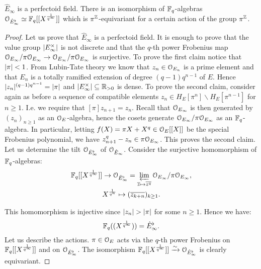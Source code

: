 \begin{prop}\label{ehatprop}
$\hat{E}_{\infty}$ is a perfectoid field. 
There is an isomorphism of $\mathbb{F}_q$-algebras $\mathcal{O}_{\hat{E}_{\infty}^{\flat}}\simeq\mathbb{F}_q[[X^{\frac{1}{q^\infty}}]]$ which is $\pi^{\mathbb{Z}}$-equivariant for a certain action of the group $\pi^{\mathbb{Z}}$.
\end{prop}
\begin{proof}
Let us prove that $\hat{E}_{\infty}$ is a perfectoid field. It is enough to prove that the value group $\lvert E^\times_{\infty}\rvert$ is not discrete and that the $q$-th power Frobenius map
$\mathcal{O}_{E_{\infty}}/\pi\mathcal{O}_{E_{\infty}}\to\mathcal{O}_{E_{\infty}}/\pi\mathcal{O}_{E_{\infty}}$ is surjective.
To prove the first claim notice that $\lvert\pi\rvert<1$. From Lubin-Tate theory we know that $z_n\in\mathcal{O}_{E_n}$ is a prime element and that $E_n$ is a totally ramified extension of degree $(q-1)q^{n-1}$ of $E$.
Hence $\lvert z_n\rvert^{(q-1)q^{n-1}}=\lvert\pi\rvert$ and $\lvert E^\times_{\infty}\rvert\subseteq\mathbb{R}_{>0}$ is dense.
To prove the second claim, consider again as before a sequence of compatible elements
$z_n\in H_E[\pi^n]\backslash H_E[\pi^{n-1}]$ for $n\geq1$. I.e. we require that $[\pi]z_{n+1}=z_n$. 
Recall that $\mathcal{O}_{E_\infty}$ is then generated by $(z_n)_{n\geq 1}$ as an $\mathcal{O}_E$-algebra, hence the cosets generate $\mathcal{O}_{E_\infty}/\pi\mathcal{O}_{E_\infty}$ as an $\mathbb{F}_q$-algebra.
In particular, letting $f(X)=\pi X + X^q\in\mathcal{O}_E[[X]]$ be the special Frobenius polynomial, we have $z^q_{n+1}-z_n\in\pi\mathcal{O}_{E_\infty}$.
This proves the second claim.
Let us determine the tilt $\mathcal{O}_{\hat{E}_{\infty}^{\flat}}$ of $\mathcal{O}_{\hat{E}_{\infty}}$.
Consider the surjective homomorphism of  $\mathbb{F}_q$-algebras:
\begin{gather*}
\mathbb{F}_q[[X^{\frac{1}{q^\infty}}]]\to \mathcal{O}_{\hat{E}_{\infty}^{\flat}} =  \varprojlim_{\overline{z}\mapsto \overline{z^q}}\mathcal{O}_{E_\infty}/\pi\mathcal{O}_{E_\infty},\\
X^{\frac{1}{q^n}}\mapsto (\overline{z_{k+n}})_{k\geq 1}.
\end{gather*}

This homomorphism is injective since $\lvert z_n\rvert>\lvert\pi\rvert$ for some $n\geq1$.
Hence we have:
$$\mathbb{F}_q((X^{\frac{1}{q^\infty}})) = \hat{E}_{\infty}^{\flat}.$$
Let us describe the actions. %
$\pi\in\mathcal{O}_E$ acts via the $q$-th power Frobenius on $\mathbb{F}_q[[X^{\frac{1}{q^\infty}}]]$ and on $\mathcal{O}_{\hat{E}_{\infty}^{\flat}}$. 
The isomorphism $\mathbb{F}_q[[X^{\frac{1}{q^\infty}}]]\xrightarrow{\sim}\mathcal{O}_{\hat{E}_{\infty}^{\flat}}$ is clearly equivariant.%
\end{proof}


